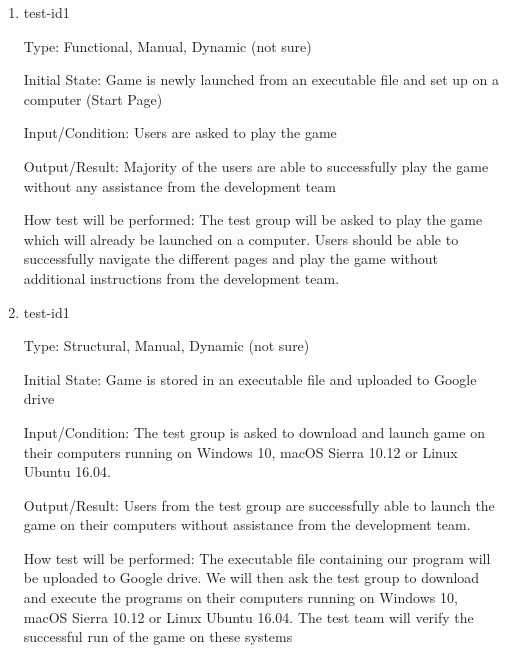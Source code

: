 \documentclass[12pt, titlepage]{article}
\begin{document}
	\begin{enumerate}
		
		
		\item{test-id1\\}
		
		Type: Functional, Manual, Dynamic (not sure)
		
		Initial State: Game is newly launched from an executable file and set up on a computer (Start Page)
		
		Input/Condition: Users are asked to play the game
		
		Output/Result: Majority of the users are able to successfully play the game without any assistance from the development team
		
		How test will be performed: The test group will be asked to play the game which will already be launched on a computer. Users should be able to successfully navigate the different pages and play the game without additional instructions from the development team.
		
		\item{test-id1\\}
		
		Type: Structural, Manual, Dynamic (not sure)
		
		Initial State: Game is stored in an executable file and uploaded to Google drive
		
		Input/Condition: The test group is asked to download and launch game on their computers running on  Windows 10, macOS Sierra 10.12 or Linux Ubuntu 16.04.
		
		Output/Result: Users from the test group are successfully able to launch the game on their computers without assistance from the development team.
		
		How test will be performed: The executable file containing our program will be uploaded to Google drive. We will then ask the test group to download and execute the programs on their computers running on  Windows 10, macOS Sierra 10.12 or Linux Ubuntu 16.04. The test team will verify the successful run of the game on these systems
		
		
	\end{enumerate}
	
\end{document}
